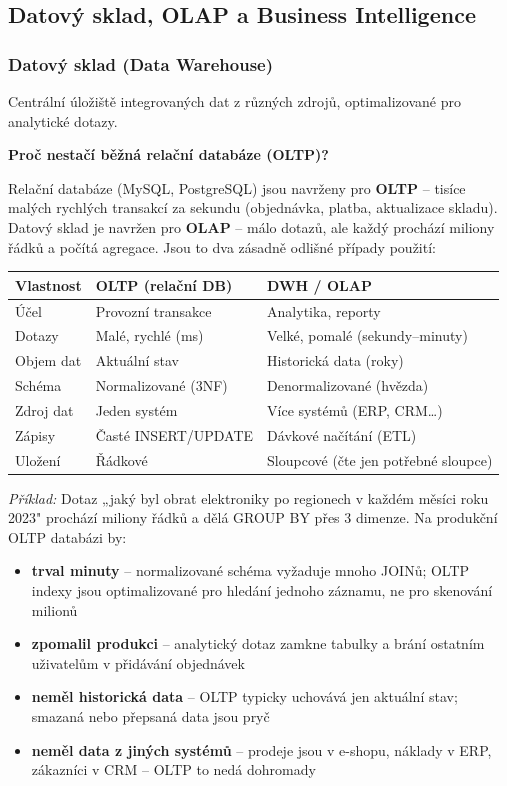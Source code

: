 \subsection{Datový sklad, OLAP a Business Intelligence}

\subsubsection{Datový sklad (Data Warehouse)}

Centrální úložiště integrovaných dat z různých zdrojů, optimalizované pro analytické dotazy.

\textbf{Proč nestačí běžná relační databáze (OLTP)?}

Relační databáze (MySQL, PostgreSQL) jsou navrženy pro \textbf{OLTP} -- tisíce malých rychlých
transakcí za sekundu (objednávka, platba, aktualizace skladu). Datový sklad je navržen pro
\textbf{OLAP} -- málo dotazů, ale každý prochází miliony řádků a počítá agregace.
Jsou to dva zásadně odlišné případy použití:

\begin{center}
\begin{tabular}{p{3.5cm}p{5cm}p{5cm}}
\toprule
\textbf{Vlastnost} & \textbf{OLTP (relační DB)} & \textbf{DWH / OLAP} \\
\midrule
Účel & Provozní transakce & Analytika, reporty \\
Dotazy & Malé, rychlé (ms) & Velké, pomalé (sekundy--minuty) \\
Objem dat & Aktuální stav & Historická data (roky) \\
Schéma & Normalizované (3NF) & Denormalizované (hvězda) \\
Zdroj dat & Jeden systém & Více systémů (ERP, CRM\ldots) \\
Zápisy & Časté INSERT/UPDATE & Dávkové načítání (ETL) \\
Uložení & Řádkové & Sloupcové (čte jen potřebné sloupce) \\
\bottomrule
\end{tabular}
\end{center}

\textit{Příklad:} Dotaz „jaký byl obrat elektroniky po regionech v každém měsíci roku 2023"
prochází miliony řádků a dělá GROUP BY přes 3 dimenze. Na produkční OLTP databázi by:
\begin{itemize}
  \item \textbf{trval minuty} -- normalizované schéma vyžaduje mnoho JOINů; OLTP indexy
    jsou optimalizované pro hledání jednoho záznamu, ne pro skenování milionů
  \item \textbf{zpomalil produkci} -- analytický dotaz zamkne tabulky a brání
    ostatním uživatelům v přidávání objednávek
  \item \textbf{neměl historická data} -- OLTP typicky uchovává jen aktuální stav;
    smazaná nebo přepsaná data jsou pryč
  \item \textbf{neměl data z jiných systémů} -- prodeje jsou v e-shopu, náklady v ERP,
    zákazníci v CRM -- OLTP to nedá dohromady
\end{itemize}

